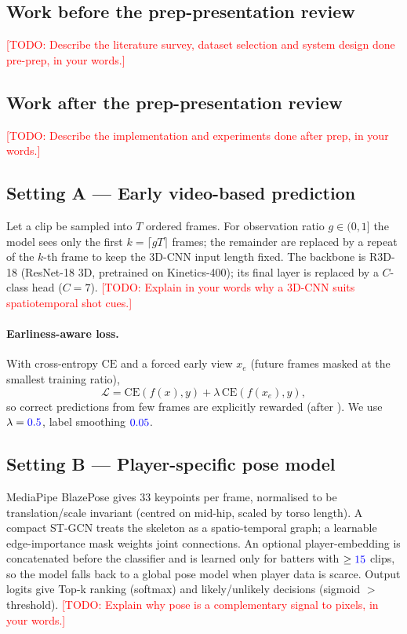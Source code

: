 \documentclass[11pt]{article}
\newcommand{\TODO}[1]{\textcolor{red}{[TODO: #1]}}
\newcommand{\NUM}[1]{\textcolor{blue}{#1}}   %
\begin{document}
\subsection{Work before the prep-presentation review}
\TODO{Describe the literature survey, dataset selection and system design done
pre-prep, in your words.}

\subsection{Work after the prep-presentation review}
\TODO{Describe the implementation and experiments done after prep, in your words.}

\subsection{Setting A --- Early video-based prediction}
Let a clip be sampled into $T$ ordered frames. For observation ratio $g\in(0,1]$
the model sees only the first $k=\lceil gT\rceil$ frames; the remainder are
replaced by a repeat of the $k$-th frame to keep the 3D-CNN input length fixed.
The backbone is R3D-18 (ResNet-18 3D, pretrained on Kinetics-400); its final
layer is replaced by a $C$-class head ($C=7$). \TODO{Explain in your words why a
3D-CNN suits spatiotemporal shot cues.}

\paragraph{Earliness-aware loss.} With cross-entropy $\mathrm{CE}$ and a forced
early view $x_e$ (future frames masked at the smallest training ratio),
\begin{equation}
\mathcal{L} = \mathrm{CE}(f(x), y) + \lambda\, \mathrm{CE}(f(x_e), y),
\end{equation}
so correct predictions from few frames are explicitly rewarded (after
\cite{aliakbarian2017}). We use $\lambda=\NUM{0.5}$, label smoothing $\NUM{0.05}$.

\subsection{Setting B --- Player-specific pose model}
MediaPipe BlazePose gives 33 keypoints per frame, normalised to be
translation/scale invariant (centred on mid-hip, scaled by torso length). A
compact ST-GCN \cite{yan2018stgcn} treats the skeleton as a spatio-temporal
graph; a learnable edge-importance mask weights joint connections. An optional
player-embedding is concatenated before the classifier and is learned only for
batters with $\geq \NUM{15}$ clips, so the model falls back to a global pose
model when player data is scarce. Output logits give Top-k ranking (softmax) and
likely/unlikely decisions (sigmoid $>$ threshold). \TODO{Explain why pose is a
complementary signal to pixels, in your words.}
\end{document}
